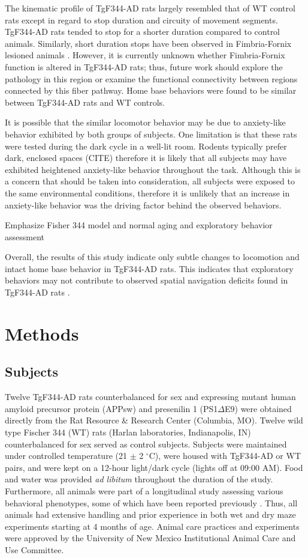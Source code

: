 \documentclass[fleqn,10pt]{wlscirep}
\begin{document}
The kinematic profile of TgF344-AD rats largely resembled that of WT control rats except in regard to stop duration and circuity of movement segments. TgF344-AD rats tended to stop for a shorter duration compared to control animals. Similarly, short duration stops have been observed in Fimbria-Fornix lesioned animals \cite{whishaw_short-stops_1994}. However, it is currently unknown whether Fimbria-Fornix function is altered in TgF344-AD rats; thus, future work should explore the pathology in this region or examine the functional connectivity between regions connected by this fiber pathway. 
Home base behaviors were found to be similar between TgF344-AD rats and WT controls.

It is possible that the similar locomotor behavior may be due to anxiety-like behavior exhibited by both groups of subjects. One limitation is that these rats were tested during the dark cycle in a well-lit room. Rodents typically prefer dark, enclosed spaces (CITE) therefore it is likely that all subjects may have exhibited heightened anxiety-like behavior throughout the task. Although this is a concern that should be taken into consideration, all subjects were exposed to the same environmental conditions, therefore it is unlikely that an increase in anxiety-like behavior was the driving factor behind the observed behaviors. 

Emphasize Fisher 344 model and normal aging and exploratory behavior assessment

Overall, the results of this study indicate only subtle changes to locomotion and intact home base behavior in TgF344-AD rats. This indicates that exploratory behaviors may not contribute to observed spatial navigation deficits found in TgF344-AD rats \cite{berkowitz_progressive_2018}. 

\section*{Methods}

\subsection*{Subjects} 
Twelve TgF344-AD rats counterbalanced for sex and expressing mutant human amyloid precursor protein (APPsw) and presenilin 1 (PS1$\Delta$E9) were obtained directly from the Rat Resource \& Research Center (Columbia, MO). Twelve wild type Fischer 344 (WT) rats (Harlan laboratories, Indianapolis, IN) counterbalanced for sex served as control subjects. Subjects were maintained under controlled temperature (21 $\pm$ 2 $^{\circ}$C), were housed with TgF344-AD or WT pairs, and were kept on a 12-hour light/dark cycle (lights off at 09:00 AM). Food and water was provided \textit{ad libitum} throughout the duration of the study. Furthermore, all animals were part of a longitudinal study assessing various behavioral phenotypes, some of which have been reported previously \cite{berkowitz_progressive_2018,pentkowski_anxiety-like_2018}. Thus, all animals had extensive handling and prior experience in both wet and dry maze experiments starting at 4 months of age. Animal care practices and experiments were approved by the University of New Mexico Institutional Animal Care and Use Committee.
\end{document}
